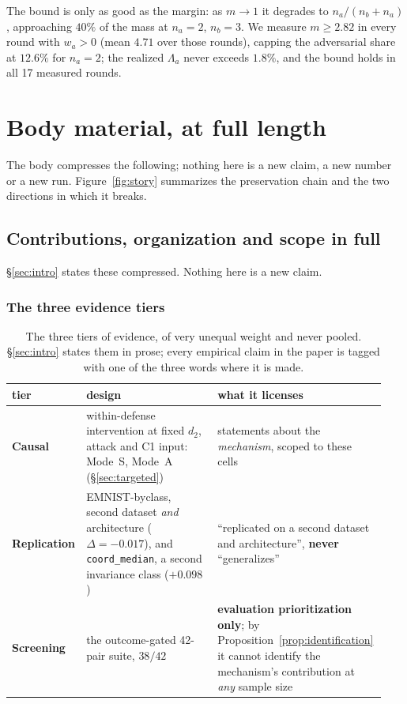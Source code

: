 \documentclass{article}
\begin{document}
\noindent The bound is only as good as the margin: as $m \to 1$ it degrades to $n_a/(n_b+n_a)$, approaching $40\%$ of the mass at $n_a{=}2$, $n_b{=}3$. We measure $m \geq 2.82$ in every round with $w_a>0$ (mean $4.71$ over those rounds), capping the adversarial share at $12.6\%$ for $n_a{=}2$; the realized $\Lambda_a$ never exceeds $1.8\%$, and the bound holds in all 17 measured rounds.

\section{Body material, at full length}
\label{app:body_full}

The body compresses the following; nothing here is a new claim, a new number or a new run.
Figure~\ref{fig:story} summarizes the preservation chain and the two directions in which it breaks.

\subsection{Contributions, organization and scope in full}
\label{app:contributions}

\S\ref{sec:intro} states these compressed. Nothing here is a new claim.

\subsubsection{The three evidence tiers}

\begin{table}[h]
\centering\small\setlength{\tabcolsep}{4pt}
\caption{The three tiers of evidence, of very unequal weight and never pooled. \S\ref{sec:intro} states them in prose; every empirical claim in the paper is tagged with one of the three words where it is made.}
\label{tab:tiers}
\begin{tabular}{@{}p{0.135\linewidth}p{0.35\linewidth}p{0.455\linewidth}@{}}
\toprule
\textbf{tier} & \textbf{design} & \textbf{what it licenses} \\
\midrule
\textbf{Causal} & within-defense intervention at fixed $d_2$, attack and C1 input: Mode~S, Mode~A (\S\ref{sec:targeted}) & statements about the \emph{mechanism}, scoped to these cells \\
\addlinespace
\textbf{Replication} & EMNIST-byclass, second dataset \emph{and} architecture ($\Delta{=}{-}0.017$), and \texttt{coord\_median}, a second invariance class ($+0.098$) & ``replicated on a second dataset and architecture'', \textbf{never} ``generalizes'' \\
\addlinespace
\textbf{Screening} & the outcome-gated 42-pair suite, $38/42$ & \textbf{evaluation prioritization only}; by Proposition~\ref{prop:identification} it cannot identify the mechanism's contribution at \emph{any} sample size \\
\bottomrule
\end{tabular}
\end{table}
\end{document}
